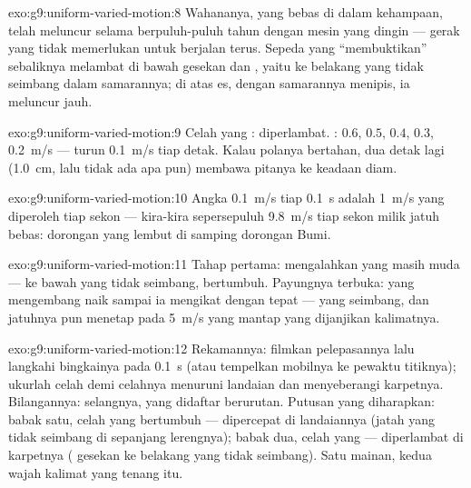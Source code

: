 \begin{solution}{exo:g9:uniform-varied-motion:8}
Wahananya, yang bebas  di dalam kehampaan, telah meluncur selama
berpuluh-puluh tahun dengan mesin yang dingin --- gerak yang tidak
memerlukan  untuk berjalan terus. Sepeda yang ``membuktikan''
sebaliknya melambat di bawah gesekan dan , yaitu  ke belakang
yang tidak seimbang dalam samarannya; di atas es, dengan samarannya
menipis, ia meluncur jauh.
\end{solution}

\begin{solution}{exo:g9:uniform-varied-motion:9}
Celah yang : diperlambat. : $0.6$, $0.5$, $0.4$,
$0.3$, \qty{0.2}{m/s} --- turun \qty{0.1}{m/s} tiap detak. Kalau
polanya bertahan, dua detak lagi (\qty{1.0}{cm}, lalu tidak ada apa
pun) membawa pitanya ke keadaan diam.
\end{solution}

\begin{solution}{exo:g9:uniform-varied-motion:10}
Angka \qty{0.1}{m/s} tiap \qty{0.1}{s} adalah \qty{1}{m/s} yang
diperoleh tiap sekon --- kira-kira sepersepuluh \qty{9.8}{m/s} tiap
sekon milik jatuh bebas: dorongan yang lembut di samping dorongan
Bumi.
\end{solution}

\begin{solution}{exo:g9:uniform-varied-motion:11}
Tahap pertama:  mengalahkan   yang masih muda ---
 ke bawah yang tidak seimbang,  bertumbuh. Payungnya
terbuka:   yang mengembang naik sampai ia mengikat
 dengan tepat ---  yang seimbang, dan jatuhnya pun
menetap pada \qty{5}{m/s} yang mantap yang dijanjikan kalimatnya.
\end{solution}

\begin{solution}{exo:g9:uniform-varied-motion:12}
Rekamannya: filmkan pelepasannya lalu langkahi bingkainya pada
\qty{0.1}{s} (atau tempelkan mobilnya ke pewaktu titiknya); ukurlah
celah demi celahnya menuruni landaian dan menyeberangi karpetnya.
Bilangannya:  selangnya, yang didaftar berurutan. Putusan yang
diharapkan: babak satu, celah yang bertumbuh --- dipercepat di
landaiannya (jatah  yang tidak seimbang di sepanjang lerengnya);
babak dua, celah yang  --- diperlambat di karpetnya (
gesekan ke belakang yang tidak seimbang). Satu mainan, kedua wajah
kalimat yang tenang itu.
\end{solution}


